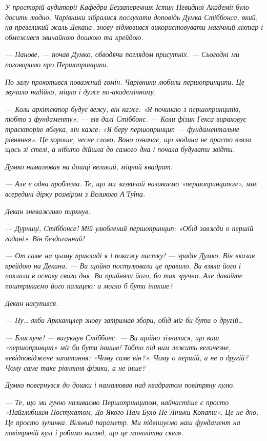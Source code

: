 \documentclass[12pt, a4paper, openany]{book}
\begin{document}
\begin{terrybox}
\textit{У просторій аудиторії Кафедри Беззаперечних Істин Невидної Академії було досить людно. Чарівники зібралися послухати доповідь Думка Стіббонса, який, на превеликий жаль Декана, знову відмовився використовувати магічний ліхтар і обмежився звичайною дошкою та крейдою.}

\textit{--- Панове, --- почав Думко, обводячи поглядом присутніх. --- Сьогодні ми поговоримо про Першопринципи.}

\textit{По залу прокотився поважний гомін. Чарівники любили першопринципи. Це звучало надійно, міцно і дуже по-академічному.}

\textit{--- Коли архітектор будує вежу, він каже: «Я починаю з першопринципів, тобто з фундаменту», --- вів далі Стіббонс. --- Коли фізик Гекса вираховує траєкторію яблука, він каже: «Я беру першопринцип --- фундаментальне рівняння». Це хороше, чесне слово. Воно означає, що людина не просто взяла щось зі стелі, а нібито дійшла до самого дна і почала будувати звідти.}

\textit{Думко намалював на дошці великий, міцний квадрат.}

\textit{--- Але є одна проблема. Те, що ми зазвичай називаємо «першопринципом», має всередині дірку розміром з Великого А'Туїна.}

\textit{Декан зневажливо пирхнув.}

\textit{--- Дурниці, Стіббонсе! Мій улюблений першопринцип: «Обід завжди о першій годині». Він бездоганний!}

\textit{--- От саме на цьому прикладі я і покажу пастку! --- зрадів Думко. Він вказав крейдою на Декана. --- Ви щойно постулювали це правило. Ви взяли його і поклали в основу свого дня. Ви прийняли його, бо так зручно. Але давайте поштрикаємо його палицею: а могло б бути інакше?}

\textit{Декан насупився.}

\textit{--- Ну\ldots{} якби Аркканцлер знову затримав збори, обід міг би бути о другій\ldots{}}

\textit{--- Блискуче! --- вигукнув Стіббонс. --- Ви щойно зізналися, що ваш «першопринцип» міг би бути іншим! Тобто під ним лежить величезне, невідповіджене запитання: «Чому саме він?». Чому о першій, а не о другій? Чому саме таке рівняння фізики, а не інше?}

\textit{Думко повернувся до дошки і намалював над квадратом повітряну кулю.}

\textit{--- Те, що ми гучно називаємо Першопринципом, найчастіше є просто «Найглибшим Постулатом, До Якого Нам Було Не Ліньки Копати». Це не дно. Це просто зупинка. Вільний параметр. Ми підвішуємо наш фундамент на повітряній кулі і робимо вигляд, що це монолітна скеля.}


\end{terrybox}
\end{document}

